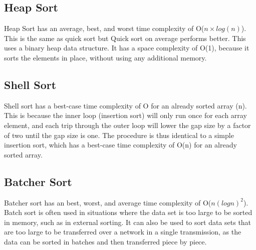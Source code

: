 \documentclass{article}
\begin{document}
\subsection{Heap Sort}
Heap Sort has an average, best, and worst time complexity of O($n\times log(n)$). This is the same as quick sort but Quick sort on average performs better. This uses a binary heap data structure. It has a space complexity of O(1), because it sorts the elements in place, without using any additional memory.
\subsection{Shell Sort}
Shell sort has a best-case time complexity of O for an already sorted array (n). This is because the inner loop (insertion sort) will only run once for each array element, and each trip through the outer loop will lower the gap size by a factor of two until the gap size is one. The procedure is thus identical to a simple insertion sort, which has a best-case time complexity of O(n) for an already sorted array.
\subsection{Batcher Sort}
Batcher sort has an best, worst, and average time complexity of O($n (log n)^2$). Batch sort is often used in situations where the data set is too large to be sorted in memory, such as in external sorting. It can also be used to sort data sets that are too large to be transferred over a network in a single transmission, as the data can be sorted in batches and then transferred piece by piece.
\end{document}
